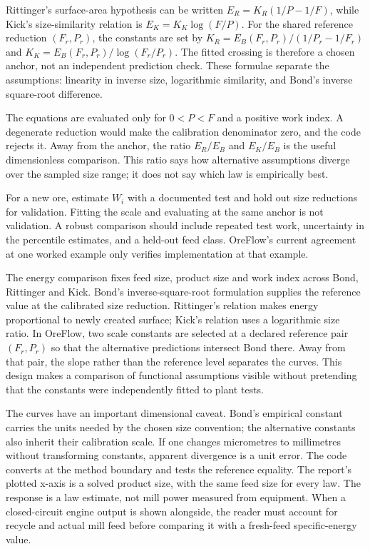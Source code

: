 \documentclass[10pt]{article}
\begin{document}
Rittinger's surface-area hypothesis can be written \(E_R=K_R(1/P-1/F)\),
while Kick's size-similarity relation is \(E_K=K_K\log(F/P)\). For the
shared reference reduction \((F_r,P_r)\), the constants are set by
\(K_R=E_B(F_r,P_r)/(1/P_r-1/F_r)\) and
\(K_K=E_B(F_r,P_r)/\log(F_r/P_r)\). The fitted crossing is therefore a
chosen anchor, not an independent prediction check. These formulae
separate the assumptions: linearity in inverse size, logarithmic
similarity, and Bond's inverse square-root difference.

The equations are evaluated only for \(0<P<F\) and a positive work
index. A degenerate reduction would make the calibration denominator
zero, and the code rejects it. Away from the anchor, the ratio
\(E_R/E_B\) and \(E_K/E_B\) is the useful dimensionless comparison. This
ratio says how alternative assumptions diverge over the sampled size
range; it does not say which law is empirically best.

For a new ore, estimate \(W_i\) with a documented test and hold out size
reductions for validation. Fitting the scale and evaluating at the same
anchor is not validation. A robust comparison should include repeated
test work, uncertainty in the percentile estimates, and a held-out feed
class. OreFlow's current agreement at one worked example only verifies
implementation at that example.

The energy comparison fixes feed size, product size and work index
across Bond, Rittinger and Kick. Bond's inverse-square-root formulation
supplies the reference value at the calibrated size reduction.
Rittinger's relation makes energy proportional to newly created surface;
Kick's relation uses a logarithmic size ratio. In OreFlow, two scale
constants are selected at a declared reference pair \((F_r,P_r)\) so
that the alternative predictions intersect Bond there. Away from that
pair, the slope rather than the reference level separates the curves.
This design makes a comparison of functional assumptions visible without
pretending that the constants were independently fitted to plant tests.

The curves have an important dimensional caveat. Bond's empirical
constant carries the units needed by the chosen size convention; the
alternative constants also inherit their calibration scale. If one
changes micrometres to millimetres without transforming constants,
apparent divergence is a unit error. The code converts at the method
boundary and tests the reference equality. The report's plotted x-axis
is a solved product size, with the same feed size for every law. The
response is a law estimate, not mill power measured from equipment. When
a closed-circuit engine output is shown alongside, the reader must
account for recycle and actual mill feed before comparing it with a
fresh-feed specific-energy value.
\end{document}
